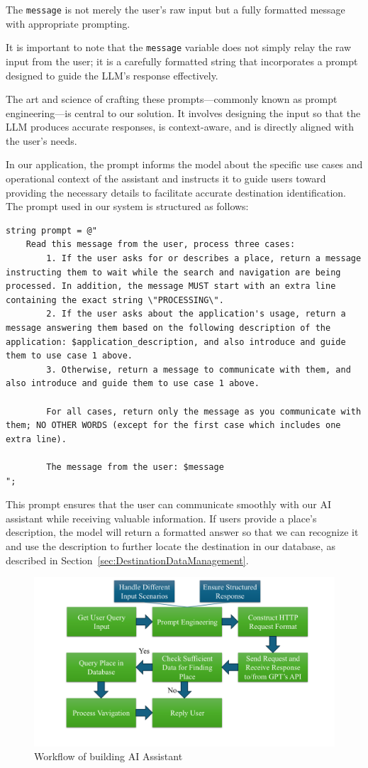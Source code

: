 The \texttt{message} is not merely the user's raw input but a fully formatted message with appropriate prompting.

It is important to note that the \texttt{message} variable does not simply relay the raw input from the user; it is a carefully formatted string that incorporates a prompt designed to guide the LLM’s response effectively.

\hypertarget{prompt-engineering}{The art and science of crafting these prompts—commonly known as prompt engineering—is central to our solution. It involves designing the input so that the LLM produces accurate responses, is context-aware, and is directly aligned with the user's needs.} In our application, the prompt informs the model about the specific use cases and operational context of the assistant and instructs it to guide users toward providing the necessary details to facilitate accurate destination identification. The prompt used in our system is structured as follows:

\begin{lstlisting}[style=cSharp]
string prompt = @"
    Read this message from the user, process three cases:
        1. If the user asks for or describes a place, return a message instructing them to wait while the search and navigation are being processed. In addition, the message MUST start with an extra line containing the exact string \"PROCESSING\".
        2. If the user asks about the application's usage, return a message answering them based on the following description of the application: $application_description, and also introduce and guide them to use case 1 above.
        3. Otherwise, return a message to communicate with them, and also introduce and guide them to use case 1 above.
        
        For all cases, return only the message as you communicate with them; NO OTHER WORDS (except for the first case which includes one extra line).

        The message from the user: $message
";
\end{lstlisting}

This prompt ensures that the user can communicate smoothly with our AI assistant while receiving valuable information. If users provide a place's description, the model will return a formatted answer so that we can recognize it and use the description to further locate the destination in our database, as described in Section~\ref{sec:DestinationDataManagement}.

\begin{figure}[ht]
  \centering
  \includegraphics[scale=0.5]{content/resources/images/chap-problems-solutions/ai-assistant-0.PNG}
  \caption{Workflow of building AI Assistant}
  \label{fig:ai-assistant-0}
\end{figure}

